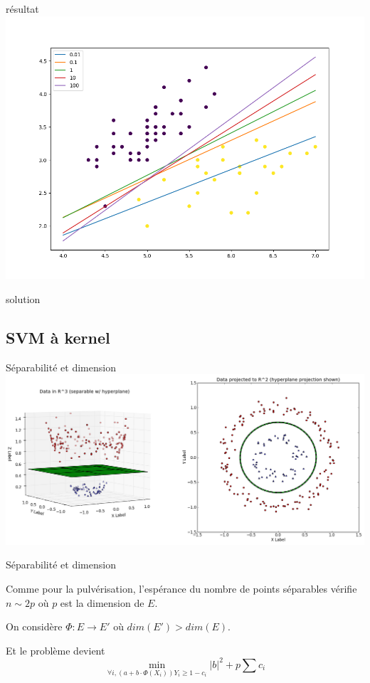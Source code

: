 \documentclass[11pt]{beamer}
\newcommand{\Pythonsmall}[1]{
	{\scriptsize }
}
\begin{document}
\begin{frame}{résultat}
\includegraphics[scale=0.4]{ext12}
\end{frame}

\begin{frame}{solution}
\Pythonsmall{ext12}
\end{frame}

\subsection{SVM à kernel}

\begin{frame}{Séparabilité et dimension}
\includegraphics[scale=0.25]{kernel}
\end{frame}

\begin{frame}{Séparabilité et dimension}

Comme pour la pulvérisation, l'espérance du nombre de points séparables vérifie $n \sim 2p$ où $p$ est la dimension de $E$.\\

\pause
\vspace{0.2cm}

On considère $ \Phi : E \rightarrow E'$ où $dim(E')>dim(E)$.

\pause
\vspace{0.2cm}

Et le problème devient 
$$\min_{\forall i, (a+b\cdot \Phi(X_i))Y_i \geq 1-c_i} |b|^2+p\sum c_i$$

\end{frame}
\end{document}
